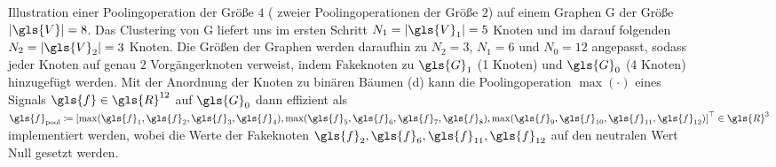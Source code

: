 \begin{figure}[t]
{
}
\caption[Pooling auf Graphen]{Illustration einer Poolingoperation der Größe $4$ (\bzw{} zweier Poo\-ling\-operationen der Größe $2$) auf einem Graphen \gls{G} der Größe $\left|\gls{V}\right| = 8$.
Das Clustering von \gls{G} liefert uns im ersten Schritt $N_1 =\left|\gls{V}_1\right| = 5$ Knoten und im darauf folgenden $N_2 = \left|\gls{V}_2\right| = 3$ Knoten.
Die Größen der Graphen werden daraufhin zu $N_2 = 3$, $N_1 = 6$ und $N_0 = 12$ angepasst, sodass jeder Knoten auf genau $2$ Vorgängerknoten verweist, indem Fakeknoten zu $\gls{G}_1$ (1 Knoten) und $\gls{G}_0$ (4 Knoten) hinzugefügt werden.
Mit der Anordnung der Knoten zu binären Bäumen (d) kann die Poolingoperation $\max\left(\cdot\right)$ eines Signals $\gls{f} \in \gls{R}^{12}$ auf $\gls{G}_0$ dann effizient als $\gls{f}_{\mathrm{pool}} \coloneqq {\left[ \max\left(\gls{f}_1, \gls{f}_2, \gls{f}_3, \gls{f}_4 \right), \max\left(\gls{f}_5, \gls{f}_6, \gls{f}_7, \gls{f}_8 \right), \max\left(\gls{f}_9, \gls{f}_{10}, \gls{f}_{11}, \gls{f}_{12} \right) \right]}^{\top} \in \gls{R}^3$ implementiert werden, wobei die Werte der Fakeknoten $\gls{f}_2, \gls{f}_6, \gls{f}_{11}, \gls{f}_{12}$ auf den neutralen Wert Null gesetzt werden.}
\label{fig:pooling}
\end{figure}
